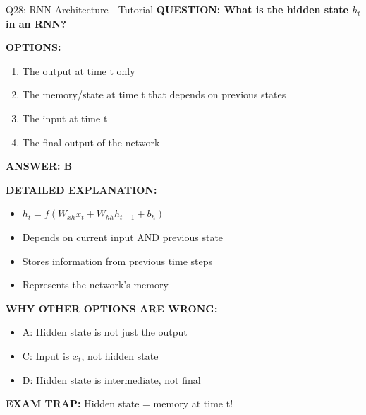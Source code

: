 \documentclass[8pt]{beamer}
\begin{document}
	\begin{frame}{Q28: RNN Architecture - Tutorial}
		\fontsize{6.5}{7.5}\selectfont
		\textbf{QUESTION: What is the hidden state $h_t$ in an RNN?}
		
		\vspace{0.1cm}
		\textbf{OPTIONS:}
		\begin{enumerate}
			\item The output at time t only
			\item The memory/state at time t that depends on previous states
			\item The input at time t
			\item The final output of the network
		\end{enumerate}
		
		\vspace{0.1cm}
		\textcolor{myblue}{\textbf{ANSWER: B}}
		
		\vspace{0.1cm}
		\textbf{DETAILED EXPLANATION:}
		\begin{itemize}
			\item $h_t = f(W_{xh}x_t + W_{hh}h_{t-1} + b_h)$
			\item Depends on current input AND previous state
			\item Stores information from previous time steps
			\item Represents the network's memory
		\end{itemize}
		
		\vspace{0.1cm}
		\textcolor{myred}{\textbf{WHY OTHER OPTIONS ARE WRONG:}}
		\begin{itemize}
			\item \textcolor{myred}{A:} Hidden state is not just the output
			\item \textcolor{myred}{C:} Input is $x_t$, not hidden state
			\item \textcolor{myred}{D:} Hidden state is intermediate, not final
		\end{itemize}
		
		\textcolor{myred}{\textbf{EXAM TRAP:}} Hidden state = \textcolor{myblue}{memory at time t}!
	\end{frame}
	
\end{document}
